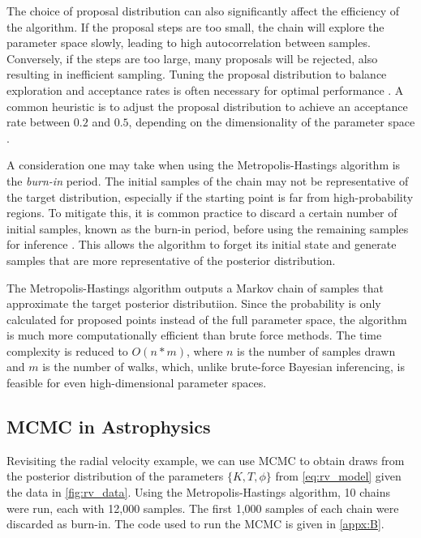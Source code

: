 \documentclass[preprint,longauthor]{aastex631}
\numberwithin{equation}{section}
\begin{document}
The choice of proposal distribution can also significantly affect the efficiency of the algorithm. If the proposal steps are too small, the chain will explore the parameter space slowly, leading to high autocorrelation between samples. Conversely, if the steps are too large, many proposals will be rejected, also resulting in inefficient sampling. Tuning the proposal distribution to balance exploration and acceptance rates is often necessary for optimal performance \citep{vontoussaintBayesianInferencePhysics2011}. A common heuristic is to adjust the proposal distribution to achieve an acceptance rate between $0.2$ and $0.5$, depending on the dimensionality of the parameter space \citep{gelmanWeakConvergenceOptimal1997}.

A consideration one may take when using the Metropolis-Hastings algorithm is the \textit{burn-in} period. The initial samples of the chain may not be representative of the target distribution, especially if the starting point is far from high-probability regions. To mitigate this, it is common practice to discard a certain number of initial samples, known as the burn-in period, before using the remaining samples for inference \citep{vanravenzwaaijSimpleIntroductionMarkov2018}. This allows the algorithm to forget its initial state and generate samples that are more representative of the posterior distribution.

The Metropolis-Hastings algorithm outputs a Markov chain of samples that approximate the target posterior distributiion. Since the probability is only calculated for proposed points instead of the full parameter space, the algorithm is much more computationally efficient than brute force methods. The time complexity is reduced to $O(n*m)$, where $n$ is the number of samples drawn and $m$ is the number of walks, which, unlike brute-force Bayesian inferencing, is feasible for even high-dimensional parameter spaces.

\subsection{MCMC in Astrophysics}

Revisiting the radial velocity example, we can use MCMC to obtain draws from the posterior distribution of the parameters $\{K,T,\phi\}$ from \autoref{eq:rv_model} given the data in \autoref{fig:rv_data}. Using the Metropolis-Hastings algorithm, 10 chains were run, each with 12,000 samples. The first 1,000 samples of each chain were discarded as burn-in. The code used to run the MCMC is given in \autoref{appx:B}.
\end{document}
